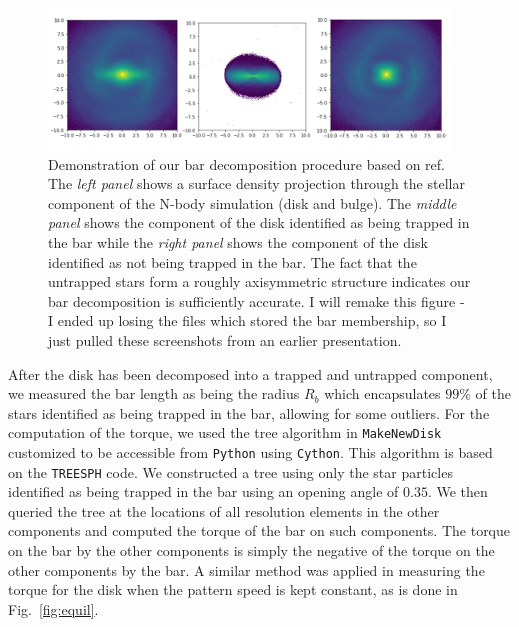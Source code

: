 \documentclass{natureprintstyle}
\begin{document}
\begin{figure}[h]%
\centering
\includegraphics[width=0.95\textwidth]{fig/fig-bar_decomp.pdf}
\caption{Demonstration of our bar decomposition procedure based on
ref.\cite{2016MNRAS.463.1952P} The \textit{left panel} shows a surface density
projection through the stellar component of the N-body simulation (disk and
bulge). The \textit{middle panel} shows the component of the disk identified
as being trapped in the bar while the \textit{right panel} shows the component
of the disk identified as not being trapped in the bar. The fact that the
untrapped stars form a roughly axisymmetric structure indicates our bar
decomposition is sufficiently accurate. {\color{red} I will remake this figure
- I ended up losing the files which stored the bar membership, so I just
pulled these screenshots from an earlier presentation.}}
\label{fig:decomp}
\end{figure}

After the disk has been decomposed into a trapped and untrapped component, we
measured the bar length as being the radius $R_b$ which encapsulates $99\%$ of
the stars identified as being trapped in the bar, allowing for some outliers.
For the computation of the torque, we used the tree algorithm in
\texttt{MakeNewDisk}\cite{2005MNRAS.361..776S} customized to be accessible
from \texttt{Python} using \texttt{Cython}. This algorithm is based on the
\texttt{TREESPH} code.\cite{1989ApJS...70..419H} We constructed a tree using
only the star particles identified as being trapped in the bar using an
opening angle of $0.35$. We then queried the tree at the locations of all
resolution elements in the other components and computed the torque of the bar
on such components. The torque on the bar by the other components is simply
the negative of the torque on the other components by the bar. A similar
method was applied in measuring the torque for the disk when the pattern speed
is kept constant, as is done in Fig.~\ref{fig:equil}.

% 
\end{document}
